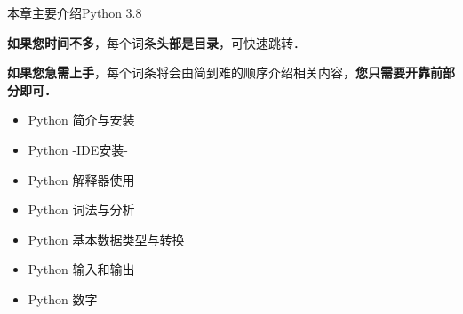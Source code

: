 
\begin{issues}
\issueTODO
\end{issues}

本章主要介绍Python 3.8

\textbf{如果您时间不多}，每个词条\textbf{头部是目录}，可快速跳转．

\textbf{如果您急需上手}，每个词条将会由简到难的顺序介绍相关内容，\textbf{您只需要开靠前部分即可．}

\begin{itemize}
\item Python 简介与安装
\item Python -IDE安装-
\item Python 解释器使用
\item Python 词法与分析
\item Python 基本数据类型与转换
\item Python 输入和输出
\item Python 数字
\end{itemize}

